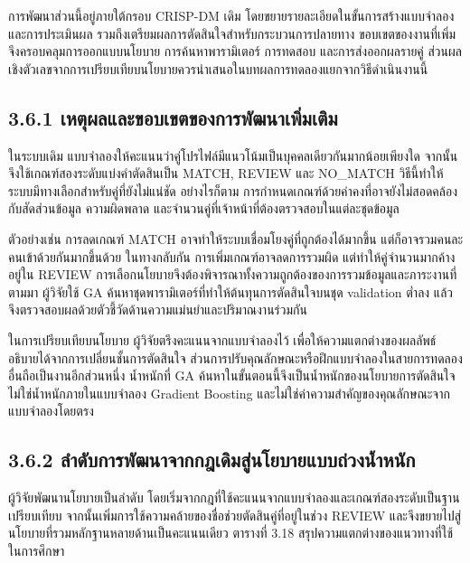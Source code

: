 \documentclass[12pt,a4paper]{report}
\begin{document}
การพัฒนาส่วนนี้อยู่ภายใต้กรอบ CRISP-DM เดิม โดยขยายรายละเอียดในขั้นการสร้างแบบจำลองและการประเมินผล รวมถึงเตรียมผลการตัดสินใจสำหรับกระบวนการปลายทาง ขอบเขตของงานที่เพิ่มจึงครอบคลุมการออกแบบนโยบาย การค้นหาพารามิเตอร์ การทดสอบ และการส่งออกผลรายคู่ ส่วนผลเชิงตัวเลขจากการเปรียบเทียบนโยบายควรนำเสนอในบทผลการทดลองแยกจากวิธีดำเนินงานนี้

\subsection*{3.6.1 เหตุผลและขอบเขตของการพัฒนาเพิ่มเติม}
ในระบบเดิม แบบจำลองให้คะแนนว่าคู่โปรไฟล์มีแนวโน้มเป็นบุคคลเดียวกันมากน้อยเพียงใด จากนั้นจึงใช้เกณฑ์สองระดับแบ่งคำตัดสินเป็น MATCH, REVIEW และ NO\_MATCH วิธีนี้ทำให้ระบบมีทางเลือกสำหรับคู่ที่ยังไม่แน่ชัด อย่างไรก็ตาม การกำหนดเกณฑ์ด้วยค่าคงที่อาจยังไม่สอดคล้องกับสัดส่วนข้อมูล ความผิดพลาด และจำนวนคู่ที่เจ้าหน้าที่ต้องตรวจสอบในแต่ละชุดข้อมูล

ตัวอย่างเช่น การลดเกณฑ์ MATCH อาจทำให้ระบบเชื่อมโยงคู่ที่ถูกต้องได้มากขึ้น แต่ก็อาจรวมคนละคนเข้าด้วยกันมากขึ้นด้วย ในทางกลับกัน การเพิ่มเกณฑ์อาจลดการรวมผิด แต่ทำให้คู่จำนวนมากค้างอยู่ใน REVIEW การเลือกนโยบายจึงต้องพิจารณาทั้งความถูกต้องของการรวมข้อมูลและภาระงานที่ตามมา ผู้วิจัยใช้ GA ค้นหาชุดพารามิเตอร์ที่ทำให้ต้นทุนการตัดสินใจบนชุด validation ต่ำลง แล้วจึงตรวจสอบผลด้วยตัวชี้วัดด้านความแม่นยำและปริมาณงานร่วมกัน

ในการเปรียบเทียบนโยบาย ผู้วิจัยตรึงคะแนนจากแบบจำลองไว้ เพื่อให้ความแตกต่างของผลลัพธ์อธิบายได้จากการเปลี่ยนชั้นการตัดสินใจ ส่วนการปรับคุณลักษณะหรือฝึกแบบจำลองในสายการทดลองอื่นถือเป็นงานอีกส่วนหนึ่ง น้ำหนักที่ GA ค้นหาในขั้นตอนนี้จึงเป็นน้ำหนักของนโยบายการตัดสินใจ ไม่ใช่น้ำหนักภายในแบบจำลอง Gradient Boosting และไม่ใช่ค่าความสำคัญของคุณลักษณะจากแบบจำลองโดยตรง

\subsection*{3.6.2 ลำดับการพัฒนาจากกฎเดิมสู่นโยบายแบบถ่วงน้ำหนัก}
ผู้วิจัยพัฒนานโยบายเป็นลำดับ โดยเริ่มจากกฎที่ใช้คะแนนจากแบบจำลองและเกณฑ์สองระดับเป็นฐานเปรียบเทียบ จากนั้นเพิ่มการใช้ความคล้ายของชื่อช่วยตัดสินคู่ที่อยู่ในช่วง REVIEW และจึงขยายไปสู่นโยบายที่รวมหลักฐานหลายด้านเป็นคะแนนเดียว ตารางที่ 3.18 สรุปความแตกต่างของแนวทางที่ใช้ในการศึกษา
\end{document}
